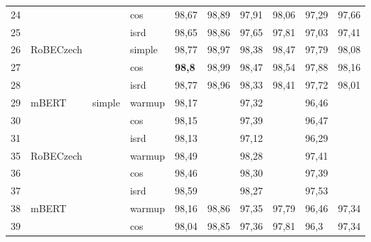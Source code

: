 \begin{table}[!ht]
{\begin{tabular}{|l|l|l|l||llllll|}
24 &                              &                         & cos    & 98,67  & 98,89   & 97,91   & 98,06    & 97,29     & 97,66      \\ \cline{1-1} \cline{4-10} 
25 &                              &                         & isrd   & 98,65  & 98,86   & 97,65   & 97,81    & 97,03     & 97,41      \\ \cline{1-2} \cline{4-10} 
26 & \multirow{3}{*}{RoBECzech}   &                         & simple & 98,77  & 98,97   & 98,38   & 98,47    & 97,79     & 98,08      \\ \cline{1-1} \cline{4-10} 
27 &                              &                         & cos    & \textbf{98,8}   & 98,99   & 98,47   & 98,54    & 97,88     & 98,16      \\ \cline{1-1} \cline{4-10} 
28 &                              &                         & isrd   & 98,77  & 98,96   & 98,33   & 98,41    & 97,72     & 98,01      \\ \hline
29 & \multirow{3}{*}{mBERT}       & \multirow{9}{*}{simple} & warmup & 98,17  &         & 97,32   &          & 96,46     &            \\ \cline{1-1} \cline{4-10} 
30 &                              &                         & cos    & 98,15  &         & 97,39   &          & 96,47     &            \\ \cline{1-1} \cline{4-10} 
31 &                              &                         & isrd   & 98,13  &         & 97,12   &          & 96,29     &            \\ \cline{1-2} \cline{4-10} 
35 & \multirow{3}{*}{RoBECzech}   &                         & warmup & 98,49  &         & 98,28   &          & 97,41     &            \\ \cline{1-1} \cline{4-10} 
36 &                              &                         & cos    & 98,46  &         & 98,30   &          & 97,39     &            \\ \cline{1-1} \cline{4-10} 
37 &                              &                         & isrd   & 98,59  &         & 98,27   &          & 97,53     &            \\ \hline
38 & \multirow{3}{*}{mBERT}       & \multirow{9}{*}{full}   & warmup & 98,16  & 98,86   & 97,35   & 97,79    & 96,46     & 97,34      \\ \cline{1-1} \cline{4-10} 
39 &                              &                         & cos    & 98,04  & 98,85   & 97,36   & 97,81    & 96,3      & 97,34      \\ \cline{1-1} \cline{4-10} 

\end{tabular}}
\end{table}
